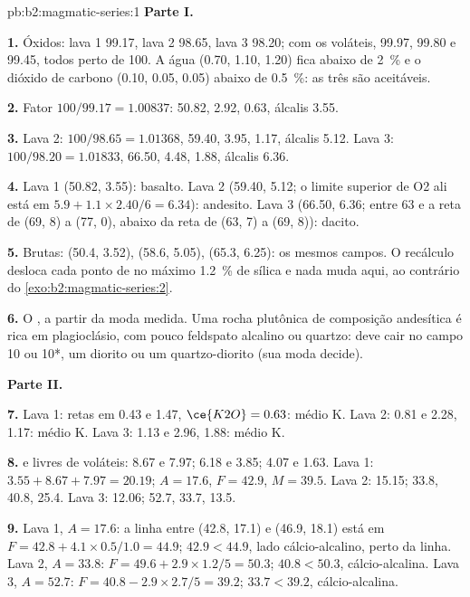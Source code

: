 \begin{solution}{pb:b2:magmatic-series:1}
\noindent\textbf{Parte I.}

\textbf{1.} Óxidos: lava 1 99.17, lava 2 98.65, lava 3 98.20; com os voláteis,
99.97, 99.80 e 99.45, todos perto de 100. A água (0.70, 1.10, 1.20) fica abaixo de
\qty{2}{\percent} e o dióxido de carbono (0.10, 0.05, 0.05) abaixo de \qty{0.5}{\percent}: as
três são aceitáveis.

\textbf{2.} Fator $100/99.17 = 1.00837$:  50.82,  2.92, 
0.63, álcalis 3.55.

\textbf{3.} Lava 2: $100/98.65 = 1.01368$,  59.40,  3.95, 
1.17, álcalis 5.12. Lava 3: $100/98.20 = 1.01833$,  66.50,  4.48,
 1.88, álcalis 6.36.

\textbf{4.} Lava 1 (50.82, 3.55): basalto. Lava 2 (59.40, 5.12; o limite superior de O2
ali está em $5.9 + 1.1\times2.40/6 = 6.34$): andesito. Lava 3 (66.50, 6.36; entre 63
e a reta de (69, 8) a (77, 0), abaixo da reta de (63, 7) a (69, 8)): dacito.

\textbf{5.} Brutas: (50.4, 3.52), (58.6, 5.05), (65.3, 6.25): os mesmos campos. O
recálculo desloca cada ponto de no máximo \qty{1.2}{\percent} de sílica e nada
muda aqui, ao contrário do \cref{exo:b2:magmatic-series:2}.

\textbf{6.} O , a partir da moda medida. Uma rocha plutônica de composição
andesítica é rica em plagioclásio, com pouco feldspato alcalino ou quartzo: deve
cair no campo 10 ou 10*, um diorito ou um quartzo-diorito (sua moda decide).

\noindent\textbf{Parte II.}

\textbf{7.} Lava 1: retas em 0.43 e 1.47, $\ce{K2O} = 0.63$: médio K. Lava 2: 0.81
e 2.28, 1.17: médio K. Lava 3: 1.13 e 2.96, 1.88: médio K.

\textbf{8.}  e  livres de voláteis: 8.67 e 7.97; 6.18 e 3.85; 4.07
e 1.63. Lava 1: $3.55 + 8.67 + 7.97 = 20.19$; $A = 17.6$, $F = 42.9$, $M = 39.5$.
Lava 2: 15.15; 33.8, 40.8, 25.4. Lava 3: 12.06; 52.7, 33.7, 13.5.

\textbf{9.} Lava 1, $A = 17.6$: a linha entre (42.8, 17.1) e (46.9, 18.1) está em
$F = 42.8 + 4.1\times0.5/1.0 = 44.9$; $42.9 < 44.9$, lado cálcio-alcalino, perto da
linha. Lava 2, $A = 33.8$: $F = 49.6 + 2.9\times1.2/5 = 50.3$; $40.8 < 50.3$,
cálcio-alcalina. Lava 3, $A = 52.7$: $F = 40.8 - 2.9\times2.7/5 = 39.2$; $33.7 < 39.2$,
cálcio-alcalina.


\end{solution}
